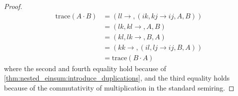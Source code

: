 \begin{proof}
    \small
    \begin{align*}
        \text{trace}(A \cdot B) & = (ll \rightarrow , (ik,kj \rightarrow ij, A, B))  \\
                                & = (lk, kl \rightarrow ,A, B)                       \\
                                & = (kl, lk \rightarrow ,B, A)                       \\
                                & = (kk \rightarrow , (il, lj \rightarrow ij, B, A)) \\
                                & = \text{trace}(B \cdot A)
    \end{align*}
    where the second and fourth equality hold because of \cref{thm:nested_einsum:introduce_duplications},
    and the third equality holds because of the commutativity of multiplication in the standard semiring.
\end{proof}
\bigskip


